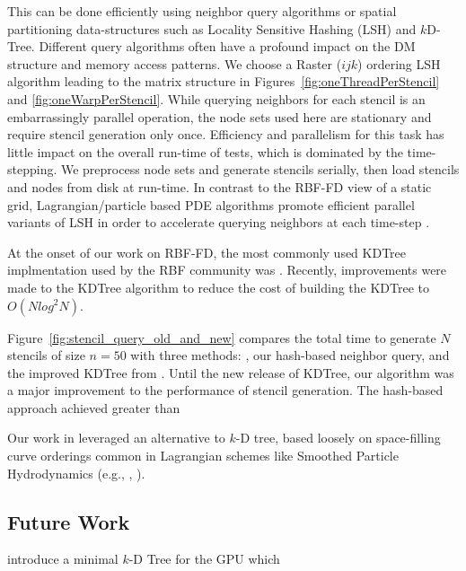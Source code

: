 \documentclass{report}
\begin{document}
This can be done efficiently using neighbor query algorithms or spatial partitioning data-structures such as Locality Sensitive Hashing (LSH) and $k$D-Tree. Different query algorithms often have a profound impact on the DM structure and memory access patterns. We choose a Raster ($ijk$) ordering LSH algorithm \cite{Bollig2011} leading to the matrix structure in Figures~\ref{fig:oneThreadPerStencil} and \ref{fig:oneWarpPerStencil}. While querying neighbors for each stencil is an embarrassingly parallel operation, the node sets used here are stationary and require stencil generation only once. Efficiency and parallelism for this task has little impact on the overall run-time of tests, which is dominated by the time-stepping. We preprocess node sets and generate stencils serially, then load stencils and nodes from disk at run-time. In contrast to the RBF-FD view of a static grid, Lagrangian/particle based PDE algorithms promote efficient parallel variants of LSH in order to accelerate querying neighbors at each time-step \cite{Pan2011, Goswami2010}. 


At the onset of our work on RBF-FD, the most commonly used KDTree implmentation used by the RBF community was \cite{Tagliasacchi2008}. Recently, improvements were made to the KDTree algorithm to reduce the cost of building the KDTree to $O(N log^2 N)$. 

Figure~\ref{fig:stencil_query_old_and_new} compares the total time to generate $N$ stencils of size $n=50$ with three methods: \cite{Tagliasacchi2008}, our hash-based neighbor query, and the improved KDTree from \cite{Tagliasacchi2012}. 
Until the new release of KDTree, our algorithm was a major improvement to the performance of stencil generation. The hash-based approach achieved greater than 


Our work in \cite{BolligFlyerErlebacher2012} leveraged an alternative to $k$-D tree, based loosely on space-filling curve orderings common in Lagrangian schemes like Smoothed Particle Hydrodynamics (e.g., \cite{IanThesis}, \cite{Kelager}). %


\subsection{Future Work}
\cite{Brown2010} introduce a minimal $k$-D Tree for the GPU which 
\end{document}
